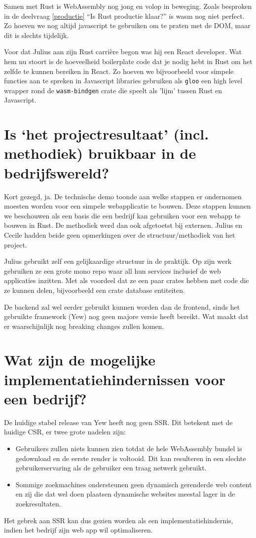 Samen met Rust is WebAssembly nog jong en volop in beweging. Zoals besproken in de deelvraag
\ref{productie} \enquote{Is Rust productie klaar?} is wasm nog niet perfect. Zo hoeven we nog altijd
javascript te gebruiken om te praten met de DOM, maar dit is slechts tijdelijk.

Voor dat Julius aan zijn Rust carrière begon was hij een React developer. Wat hem nu stoort is de
hoeveelheid boilerplate code dat je nodig hebt in Rust om het zelfde te kunnen bereiken in React.
Zo hoeven we bijvoorbeeld voor simpele functies aan te spreken in Javascript libraries gebruiken als
\texttt{gloo} een high level wrapper rond de \texttt{wasm-bindgen} crate die
speelt als 'lijm' tussen Rust en Javascript.

\clearpage

\section{Is ‘het projectresultaat’ (incl. methodiek) bruikbaar in de bedrijfswereld?}

Kort gezegd, ja. De technische demo toonde aan welke stappen er ondernomen moesten worden voor een
simpele webapplicatie te bouwen. Deze stappen kunnen we beschouwen als een basis die een bedrijf kan
gebruiken voor een webapp te bouwen in Rust. De methodiek werd dan ook afgetoetst bij externen.
Julius en Cecile hadden beide geen opmerkingen over de structuur/methodiek van het project. 

Julius gebruikt zelf een gelijkaardige structuur in de praktijk. Op zijn werk gebruiken ze een grote
mono repo waar all hun services inclusief de web applicaties inzitten. Met als voordeel dat ze een
paar crates hebben met code die ze kunnen delen, bijvoorbeeld een crate database entiteiten.

De backend zal wel eerder gebruikt kunnen worden dan de frontend, sinds het gebruikte framework
(Yew) nog geen majore versie heeft bereikt. Wat maakt dat er waarschijnlijk nog breaking changes
zullen komen.


\section{Wat zijn de mogelijke implementatiehindernissen voor een bedrijf?}

De huidige stabel release van Yew heeft nog geen SSR. Dit betekent met de huidige CSR, er twee grote
nadelen zijn:
\begin{itemize}
   \item Gebruikers zullen niets kunnen zien totdat de hele WebAssembly bundel is gedownload en de
   eerste render is voltooid. Dit kan resulteren in een slechte gebruikerservaring als de gebruiker
   een traag netwerk gebruikt.

  \item Sommige zoekmachines ondersteunen geen dynamisch gerenderde web content en zij die dat wel
  doen plaatsen dynamische websites meestal lager in de zoekresultaten.
\end{itemize}
Het gebrek aan SSR kan dus gezien worden als een implementatiehindernis, indien het bedrijf zijn web
app wil optimaliseren.

